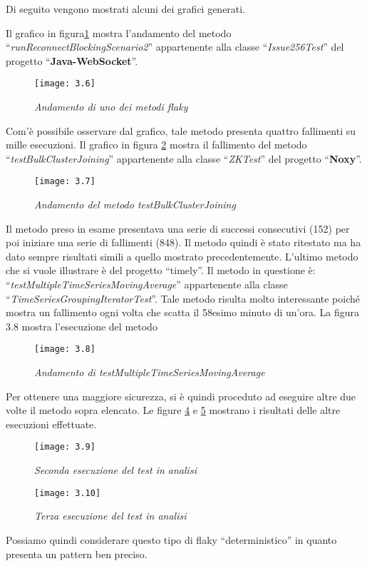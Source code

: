 Di seguito vengono mostrati alcuni dei grafici generati.

Il grafico in figura\ref{fig:AndamentoFlaky} mostra l’andamento del metodo
“\emph{runReconnectBlockingScenario2}” appartenente alla classe “\emph{Issue256Test}” del progetto “\textbf{Java-WebSocket}”.
\begin{figure}[h]
	\centering
	\texttt{[image: 3.6]}
	\caption{\emph{Andamento di uno dei metodi flaky}}
	\label{fig:AndamentoFlaky}
\end{figure}

Com’è possibile osservare dal grafico, tale metodo presenta quattro fallimenti su mille esecuzioni. Il grafico in figura \ref{fig:fallimentobulk} mostra il fallimento del metodo “\emph{testBulkClusterJoining}” appartenente alla classe “\emph{ZKTest}” del progetto “\textbf{Noxy}”.
\newpage
\begin{figure}[h]
	\centering
	\texttt{[image: 3.7]}
	\caption{\emph{Andamento del metodo testBulkClusterJoining}}
	\label{fig:fallimentobulk}
\end{figure}
Il metodo preso in esame presentava una serie di successi consecutivi (152) per poi iniziare una serie di fallimenti (848). Il metodo quindi è stato ritestato ma ha dato sempre risultati simili a quello mostrato precedentemente.
L’ultimo metodo che si vuole illustrare è del progetto “timely”. Il metodo in questione è: “\emph{testMultipleTimeSeriesMovingAverage}” appartenente alla classe
“\emph{TimeSeriesGroupingIteratorTest}”. Tale metodo risulta molto interessante poiché mostra un fallimento ogni volta che scatta il 58esimo minuto di un’ora.
La figura 3.8 mostra l’esecuzione del metodo
\begin{figure}[h]
	\centering
	\texttt{[image: 3.8]}
	\caption{\emph{Andamento di testMultipleTimeSeriesMovingAverage}}
	\label{fig:patternFlaky}
\end{figure}
Per ottenere una maggiore sicurezza, si è quindi proceduto ad eseguire altre due volte il metodo sopra elencato.
Le figure \ref{fig:riesecuzione1} e \ref{fig:riesecuzione2} mostrano i risultati delle altre esecuzioni effettuate.
\newpage
\begin{figure}[h]
	\centering
	\texttt{[image: 3.9]}
	\caption{\emph{Seconda esecuzione del test in analisi}}
	\label{fig:riesecuzione1}
\end{figure}
\begin{figure}[h]
	\centering
	\texttt{[image: 3.10]}
	\caption{\emph{Terza esecuzione del test in analisi}}
	\label{fig:riesecuzione2}
\end{figure}
Possiamo quindi considerare questo tipo di flaky “deterministico” in quanto presenta un pattern ben preciso.
